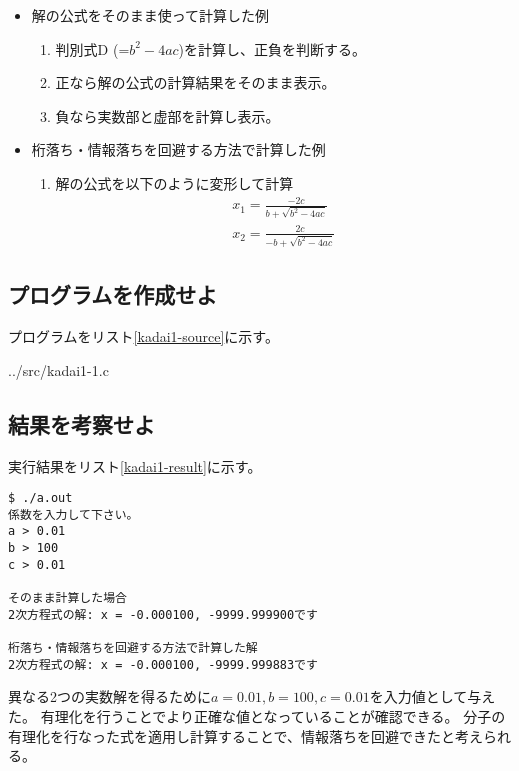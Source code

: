 \documentclass[]{jsarticle}
\begin{document}
\begin{itemize}
\item 解の公式をそのまま使って計算した例
\begin{enumerate}
\item 判別式D (=$b^{2}-4ac$)を計算し、正負を判断する。
\item 正なら解の公式の計算結果をそのまま表示。
\item 負なら実数部と虚部を計算し表示。
\end{enumerate}

\item 桁落ち・情報落ちを回避する方法で計算した例
\begin{enumerate}
\item 解の公式を以下のように変形して計算
\begin{eqnarray}
x_{1} = \frac{-2c}{b+\sqrt{b^{2}-4ac}} \\
x_{2} = \frac{2c}{-b+\sqrt{b^{2}-4ac}}
\end{eqnarray}

\end{enumerate}

\end{itemize}


\subsection{プログラムを作成せよ}

プログラムをリスト\ref{kadai1-source}に示す。


{../src/kadai1-1.c}


\subsection{結果を考察せよ}

実行結果をリスト\ref{kadai1-result}に示す。

\begin{lstlisting}[caption=実行結果,label=kadai1-result]
$ ./a.out
係数を入力して下さい。
a > 0.01
b > 100
c > 0.01

そのまま計算した場合
2次方程式の解: x = -0.000100, -9999.999900です

桁落ち・情報落ちを回避する方法で計算した解
2次方程式の解: x = -0.000100, -9999.999883です
\end{lstlisting}

異なる2つの実数解を得るために$a=0.01, b=100, c=0.01$を入力値として与えた。
有理化を行うことでより正確な値となっていることが確認できる。
分子の有理化を行なった式を適用し計算することで、情報落ちを回避できたと考えられる。
\end{document}
